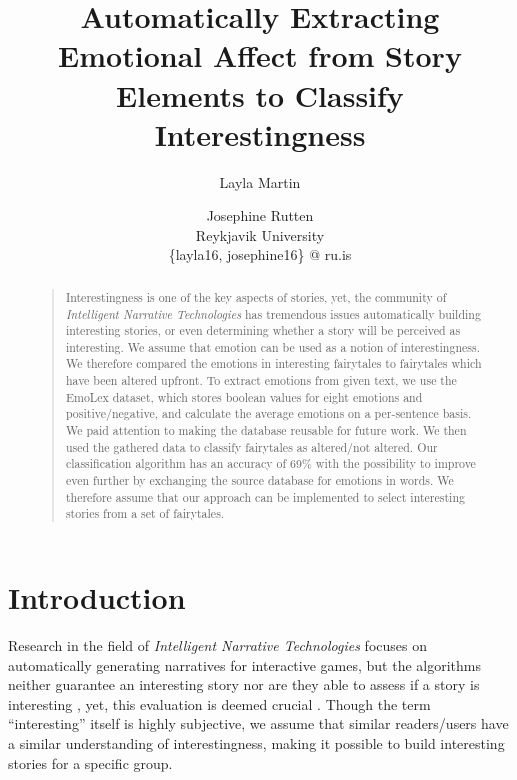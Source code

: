 \documentclass[letterpaper]{article}
\begin{document}
 
\title{Automatically Extracting Emotional Affect from Story Elements to Classify Interestingness}
\author{Layla Martin \and  Josephine Rutten \\
Reykjavik University \\ \{layla16, josephine16\} @ ru.is }

\maketitle
\begin{abstract}
\begin{quote}
Interestingness is one of the key aspects of stories, yet, the community of \textit{Intelligent Narrative Technologies} has tremendous issues automatically building interesting stories, or even determining whether a story will be perceived as interesting. We assume that emotion can be used as a notion of interestingness. We therefore compared the emotions in interesting fairytales to fairytales which have been altered upfront. To extract emotions from given text, we use the EmoLex dataset, which stores boolean values for eight emotions and positive/negative, and calculate the average emotions on a per-sentence basis. We paid attention to making the database reusable for future work. We then used the gathered data to classify fairytales as altered/not altered. Our classification algorithm has an accuracy of 69\% with the possibility to improve even further by exchanging the source database for emotions in words. We therefore assume that our approach can be implemented to select interesting stories from a set of fairytales. 
\end{quote}
\end{abstract}

\section{Introduction}

Research in the field of \textit{Intelligent Narrative Technologies} focuses on automatically generating narratives for interactive games, but the algorithms neither guarantee an interesting story nor are they able to assess if a story is interesting \cite{Riedl}, yet, this evaluation is deemed crucial \cite{rowe2009storyeval}. Though the term ``interesting'' itself is highly subjective, we assume that similar readers/users have a similar understanding of interestingness, making it possible to build interesting stories for a specific group. 
\end{document}

